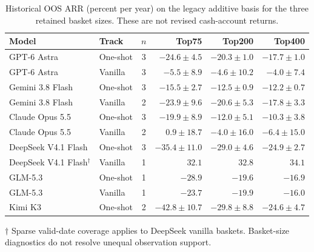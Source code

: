 \begin{table}[htbp]
\centering
\footnotesize
\caption{Historical OOS ARR (percent per year) on the legacy additive basis for the three retained basket sizes. These are not revised cash-account returns.}
\label{tab:topn_diagnostics}
\setlength{\tabcolsep}{3pt}
\begin{tabular}{@{}llcrrr@{}}
\toprule
Model & Track & $n$ & Top75 & Top200 & Top400 \\
\midrule
GPT-6 Astra & One-shot & 3 & $-24.6 \pm 4.5$ & $-20.3 \pm 1.0$ & $-17.7 \pm 1.0$ \\
GPT-6 Astra & Vanilla & 3 & $-5.5 \pm 8.9$ & $-4.6 \pm 10.2$ & $-4.0 \pm 7.4$ \\
Gemini 3.8 Flash & One-shot & 3 & $-15.5 \pm 2.7$ & $-12.5 \pm 0.9$ & $-12.2 \pm 0.7$ \\
Gemini 3.8 Flash & Vanilla & 2 & $-23.9 \pm 9.6$ & $-20.6 \pm 5.3$ & $-17.8 \pm 3.3$ \\
Claude Opus 5.5 & One-shot & 3 & $-19.9 \pm 8.9$ & $-12.0 \pm 5.1$ & $-10.3 \pm 3.8$ \\
Claude Opus 5.5 & Vanilla & 2 & $0.9 \pm 18.7$ & $-4.0 \pm 16.0$ & $-6.4 \pm 15.0$ \\
DeepSeek V4.1 Flash & One-shot & 3 & $-35.4 \pm 11.0$ & $-29.0 \pm 4.6$ & $-24.9 \pm 2.7$ \\
DeepSeek V4.1 Flash$^{\dagger}$ & Vanilla & 1 & $32.1$ & $32.8$ & $34.1$ \\
GLM-5.3 & One-shot & 1 & $-28.9$ & $-19.6$ & $-16.9$ \\
GLM-5.3 & Vanilla & 1 & $-23.7$ & $-19.9$ & $-16.0$ \\
Kimi K3 & One-shot & 2 & $-42.8 \pm 10.7$ & $-29.8 \pm 8.8$ & $-24.6 \pm 4.7$ \\
\bottomrule
\end{tabular}
\par\smallskip
\begin{minipage}{\linewidth}\footnotesize $\dagger$ Sparse valid-date coverage applies to DeepSeek vanilla baskets. Basket-size diagnostics do not resolve unequal observation support.\end{minipage}
\end{table}
